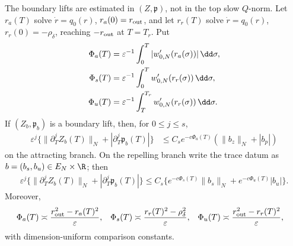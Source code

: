 \begin{proposition}
The boundary lifts are estimated in \((Z,\mathfrak p)\), not in the top
slow \(Q\)-norm.  Let \(r_a(T)\) solve
\(\dot r=q_0(r)\), \(r_a(0)=r_{\rm out}\), and let \(r_r(T)\) solve
\(\dot r=q_0(r)\), \(r_r(0)=-\rho_\delta\), reaching
\(-r_{\rm out}\) at \(T=T_r\).  Put
\begin{align}
 \Phi_a(T)&=\varepsilon^{-1}\int_0^T
        |w_{0,N}'(r_a(\sigma))|\,\dd\sigma,\notag\\
 \Phi_s(T)&=\varepsilon^{-1}\int_0^T
        w_{0,N}'(r_r(\sigma))\,\dd\sigma,\notag\\
 \Phi_u(T)&=\varepsilon^{-1}\int_T^{T_r}
        w_{0,N}'(r_r(\sigma))\,\dd\sigma.          \label{eq:principal-green-actions}
\end{align}
If \((Z_b,\mathfrak p_b)\) is a boundary lift, then, for
\(0\le j\le s\),
\begin{align}
 \varepsilon^j\bigl\{
  \|\partial_T^jZ_b(T)\|_N
       +|\partial_T^j\mathfrak p_b(T)|\bigr\}
 &\le C_se^{-c\Phi_a(T)}(\|b_z\|_N+|b_p|)          \label{eq:principal-green-attracting-layer}
\end{align}
on the attracting branch.  On the repelling branch write the trace datum
as \(b=(b_s,b_u)\in E_N\times\R\); then
\begin{align}
 \varepsilon^j\bigl\{
  \|\partial_T^jZ_b(T)\|_N
       +|\partial_T^j\mathfrak p_b(T)|\bigr\}
 \le C_s\bigl\{
 e^{-c\Phi_s(T)}\|b_s\|_N
 +e^{-c\Phi_u(T)}|b_u|\bigr\}.                     \label{eq:principal-green-repelling-layer}
\end{align}
Moreover,
\begin{align}
 \Phi_a(T)&\asymp
     \frac{r_{\rm out}^2-r_a(T)^2}{\varepsilon},&
 \Phi_s(T)&\asymp
     \frac{r_r(T)^2-\rho_\delta^2}{\varepsilon},&
 \Phi_u(T)&\asymp
     \frac{r_{\rm out}^2-r_r(T)^2}{\varepsilon},  \label{eq:principal-green-action-comparison}
\end{align}
with dimension-uniform comparison constants.
\end{proposition}

